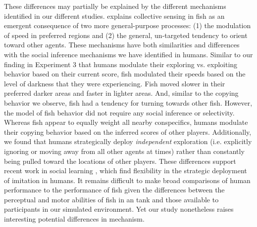 \documentclass[12pt,letterpaper]{article}
\begin{document}


These differences may partially be explained by the different mechanisms identified in our different studies.
 explains collective sensing in fish as an emergent consequence of two more general-purpose processes: (1) the modulation of speed in preferred regions and (2) the general, un-targeted tendency to orient toward other agents.
These mechanisms have both similarities and differences with the social inference mechanisms we have identified in humans.
Similar to our finding in Experiment 3 that humans modulate their exploring vs. exploiting behavior based on their current score, fish modulated their speeds based on the level of darkness that they were experiencing.  
Fish moved slower in their preferred darker areas and faster in lighter areas.  
And, similar to the copying behavior we observe, fish had a tendency for turning towards other fish.  
However, the model of fish behavior  did not require any social inference or selectivity. 
Whereas fish appear to equally weight all nearby conspecifics, humans modulate their copying behavior based on the inferred scores of other players.
Additionally, we found that humans strategically deploy \emph{independent} exploration (i.e. explicitly ignoring or moving away from all other agents at times) rather than constantly being pulled toward the locations of other players. 
These differences support recent work in social learning \cite{wisdom_social_2013, mcelreath_beyond_2008}, which find flexibility in the strategic deployment of imitation in humans.
It remains difficult to make broad comparisons of human performance to the performance of fish given the differences between the perceptual and motor abilities of fish in an tank and those available to participants in our simulated environment. 
Yet our study nonetheless raises interesting potential differences in mechanism.  
\end{document}
